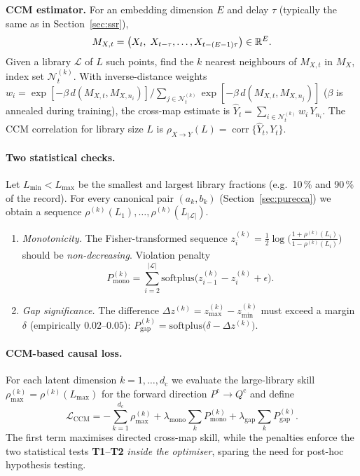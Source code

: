\documentclass[14pt]{extarticle}
\begin{document}
	\vspace{0.2em}
	\noindent\textbf{CCM estimator.}
	For an embedding dimension $E$ and delay $\tau$ (typically the same as
	in Section~\ref{sec:ssr}),
	\[
	M_{X,t}
	=\bigl(X_t,\;X_{t-\tau},\dots,X_{t-(E-1)\tau}\bigr)\in\mathbb{R}^{E}.
	\]
	Given a library $\mathcal L$ of $L$ such points,
	find the $k$ nearest neighbours of $M_{X,t}$ in $M_X$,
	index set $\mathcal N_t^{(k)}$.
	With inverse-distance weights
	$
	w_i=\exp[-\beta\,d(M_{X,t},M_{X,n_i})]\big/\!\!\sum_{j\in\mathcal N_t^{(k)}}\exp[-\beta\,d(M_{X,t},M_{X,n_j})]
	$
	($\beta$ is annealed during training),
	the cross-map estimate is
	$
	\widehat{Y}_t=\sum_{i\in\mathcal N_t^{(k)}}w_i\,Y_{n_i}.
	$
	The CCM correlation for library size $L$ is
	$\rho_{X\to Y}(L)=\operatorname{corr}\!\bigl\{\widehat{Y}_t,Y_t\bigr\}.$
	
	\paragraph{Two statistical checks.}
	Let
	$L_{\min}\!<\!L_{\max}$ be the smallest and largest library
	fractions (e.g.\ 10\,\% and 90\,\% of the record).
	For every canonical pair $(a_k,b_k)$ (Section~\ref{sec:purecca}) we
	obtain a sequence
	$\rho^{(k)}(L_1),\dots,\rho^{(k)}(L_{|\mathcal L|})$.
	
	\begin{enumerate}[label=\textbf{T\arabic*}),leftmargin=1.5em,noitemsep]
		\item \textit{Monotonicity.}  
		The Fisher-transformed sequence
		$z^{(k)}_i=\tfrac12\log\!\bigl(\tfrac{1+\rho^{(k)}(L_i)}
		{1-\rho^{(k)}(L_i)}\bigr)$
		should be \emph{non-decreasing}.  Violation penalty
		\[
		P^{(k)}_{\text{mono}}
		= \sum_{i=2}^{|\mathcal L|}
		\mathrm{softplus}\!\bigl(z^{(k)}_{i-1}-z^{(k)}_{i}+\epsilon\bigr).
		\]
		\item \textit{Gap significance.}  
		The difference
		$\Delta z^{(k)} = z^{(k)}_{\max}-z^{(k)}_{\min}$ must exceed a margin
		$\delta$ (empirically $0.02$–$0.05$):
		$
		P^{(k)}_{\text{gap}}
		= \mathrm{softplus}\!\bigl(\delta-\Delta z^{(k)}\bigr).
		$
	\end{enumerate}
	
	\paragraph{CCM-based causal loss.}
	For each latent dimension $k\!=\!1,\dots,d_{\mathrm c}$ we evaluate the
	large-library skill
	$\rho^{(k)}_{\max}\!=\!\rho^{(k)}(L_{\max})$ for the forward direction
	$P^{\mathrm c}\!\to\!Q^{\mathrm c}$ and define
	\[
	\mathcal L_{\text{CCM}}
	= -\sum_{k=1}^{d_{\mathrm c}}\rho^{(k)}_{\max}
	+ \lambda_{\text{mono}}\sum_{k}P^{(k)}_{\text{mono}}
	+ \lambda_{\text{gap}}\sum_{k}P^{(k)}_{\text{gap}}.
	\]
	The first term maximises directed cross-map skill,
	while the penalties enforce the two statistical tests \textbf{T1}–\textbf{T2}
	\emph{inside the optimiser}, sparing the need for post-hoc
	hypothesis testing.
	
\end{document}
